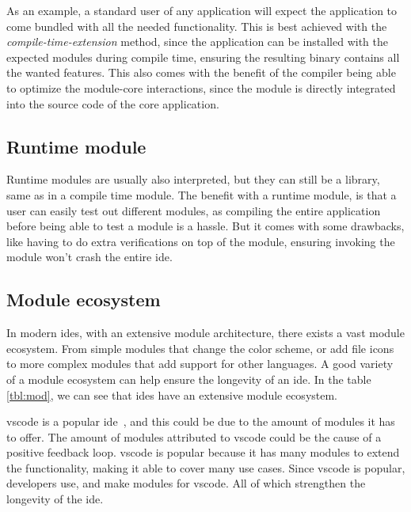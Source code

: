As an example, a standard user of any application will expect the application to
come bundled with all the needed functionality. This is best achieved with the
\textit{compile-time-extension} method, since the application can be installed
with the expected modules during compile time, ensuring the resulting binary
contains all the wanted features. This also comes with the benefit of the
compiler being able to optimize the module-core interactions, since the module
is directly integrated into the source code of the core application.

\subsection{Runtime module}

Runtime modules are usually also interpreted, but they can still be a
library, same as in a compile time module. The benefit with a runtime module,
is that a user can easily test out different modules, as compiling the entire
application before being able to test a module is a hassle. But it comes with
some drawbacks, like having to do extra verifications on top of the module,
ensuring invoking the module won't crash the entire \gls*{ide}.

\subsection{Module ecosystem}

In modern \gls*{ide}s, with an extensive module architecture, there exists a
vast module ecosystem. From simple modules that change the color scheme, or
add file icons to more complex modules that add support for other languages.
A good variety of a module ecosystem can help ensure the longevity of an
\gls*{ide}. In the table \ref{tbl:mod}, we can see that \gls*{ide}s have an
extensive module ecosystem.\footnotemark{}


\gls*{vscode} is a popular \gls*{ide}~\cite{topIde}, and this could be due to
the amount of modules it has to offer. The amount of modules attributed to
\gls*{vscode} could be the cause of a positive feedback loop. \gls*{vscode} is
popular because it has many modules to extend the functionality, making it able
to cover many use cases. Since \gls*{vscode} is popular, developers use, and make
modules for \gls*{vscode}. All of which strengthen the longevity of the
\gls*{ide}.

